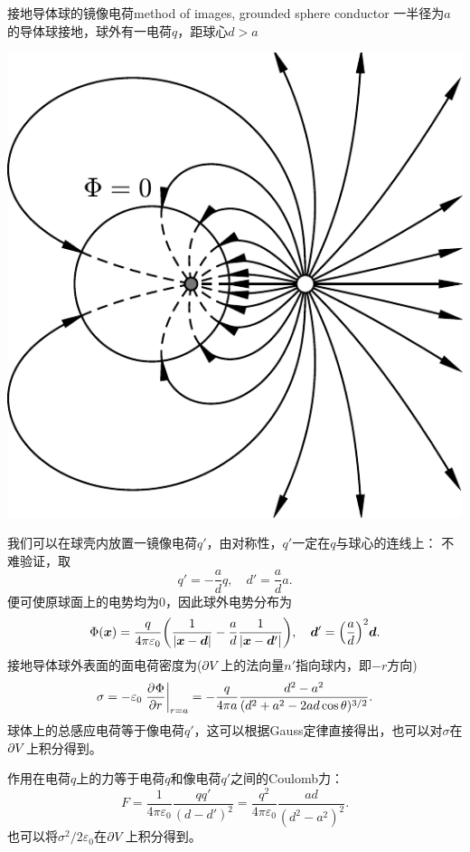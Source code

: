 \begin{example}{接地导体球的镜像电荷}{method of images, grounded sphere conductor}
    一半径为$a$的导体球接地，球外有一电荷$q$，距球心$d>a$
    \begin{center}
        \includegraphics[width=0.45\linewidth]{graphs/image_charge_sphere.pdf}
        \label{fig:image charge of sphere}
    \end{center}
    我们可以在球壳内放置一镜像电荷$q'$，由对称性，$q'$一定在$q$与球心的连线上：
    不难验证，取
    \begin{equation}
        \label{eqn:image charge of sphere}
        q'=-\frac adq,\quad d'=\frac ada.
    \end{equation}
    便可使原球面上的电势均为0，因此球外电势分布为
    \begin{equation}
        \Phi(\bm x)=\frac q{4\pi\varepsilon_0}\biggl(\frac1{|\bm x-\bm d|}-\frac ad\frac1{|\bm x-\bm d'|}\biggr),\quad\bm d'=\Bigl(\frac ad\Bigr)^2\bm d.
    \end{equation}
    \tcblower
    接地导体球外表面的面电荷密度为($\partial V$上的法向量$n'$指向球内，即$-r$方向)
    \begin{equation}
        \label{eqn:grounded sphere conductor-point, sigma}
        \sigma=-\varepsilon_0\left.\frac{\partial^{{}}\Phi}{\partial{r}^{{}}}\right\rvert_{r=a}=-\frac q{4\pi a}\frac{d^2-a^2}{(d^2+a^2-2ad\cos\theta)^{3/2}}.
    \end{equation}
    球体上的总感应电荷等于像电荷$q'$，这可以根据Gauss定律直接得出，也可以对$\sigma$在$\partial V$上积分得到。

    作用在电荷$q$上的力等于电荷$q$和像电荷$q'$之间的Coulomb力：
    \begin{equation}
        \label{eqn:grounded sphere conductor-point, F}
        F=\frac1{4\pi\varepsilon_0}\frac{qq'}{(d-d')^2}=\frac{q^2}{4\pi\varepsilon_0}\frac{ad}{(d^2-a^2)^2}.
    \end{equation}
    也可以将$\sigma^2/2\varepsilon_0$在$\partial V$上积分得到。
\end{example}

